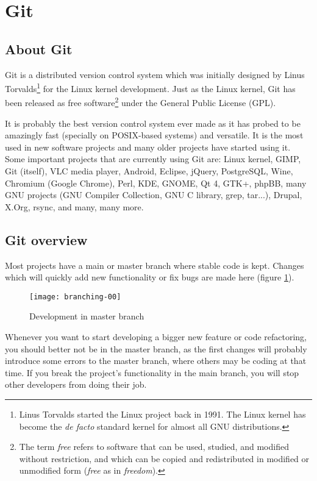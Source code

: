 \documentclass[a4paper,10pt]{article}
\begin{document}
\section{Git}

\subsection{About Git}

Git is a distributed version control system which was initially designed
by Linus Torvalds\footnote{Linus Torvalds started the Linux project back
in 1991. The Linux kernel has become the \textit{de facto} standard
kernel for almost all GNU distributions.} for the Linux kernel
development. Just as the Linux kernel, Git has been released as free
software\footnote{The term \textit{free} refers to software that can be
used, studied, and modified without restriction, and which can be copied
and redistributed in modified or unmodified form (\textit{free} as in
\textit{freedom}).} under the General Public License (GPL).

It is probably the best version control system ever made as it has probed
to be amazingly fast (specially on POSIX-based systems) and versatile.
It is the most used in new software projects and many older projects have
started using it. Some important projects that are currently using Git
are:
Linux kernel,
GIMP,
Git (itself),
VLC media player,
Android,
Eclipse,
jQuery,
PostgreSQL,
Wine,
Chromium (Google Chrome),
Perl,
KDE,
GNOME,
Qt 4,
GTK+,
phpBB,
many GNU projects (GNU Compiler Collection, GNU C library, grep, tar...),
Drupal,
X.Org,
rsync,
and many, many more.

\subsection{Git overview}

Most projects have a main or master branch where stable code is kept. Changes
which will quickly add new functionality or fix bugs are made here (figure
\ref{master-branch}).

\begin{figure}
  \begin{center}
    \texttt{[image: branching-00]}
  \end{center}
  \caption{Development in master branch}
  \label{master-branch}
\end{figure}

Whenever you want to start developing a bigger new feature or code refactoring,
you should better not be in the master branch, as the first changes will
probably introduce some errors to the master branch, where others may be coding
at that time. If you break the project's functionality in the main branch, you
will stop other developers from doing their job.
\end{document}
